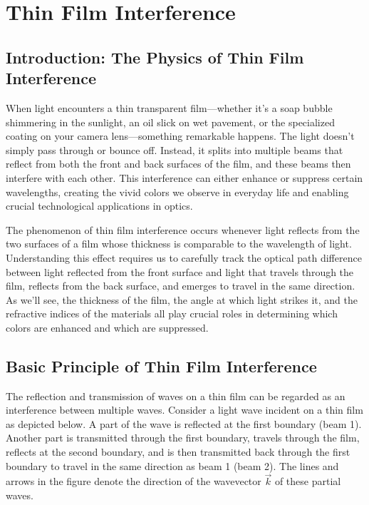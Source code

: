\documentclass[
  a4paper,
]{book}
\begin{document}
\chapter{Thin Film Interference}\label{thin-film-interference}

\section{Introduction: The Physics of Thin Film
Interference}\label{introduction-the-physics-of-thin-film-interference}

When light encounters a thin transparent film---whether it's a soap
bubble shimmering in the sunlight, an oil slick on wet pavement, or the
specialized coating on your camera lens---something remarkable happens.
The light doesn't simply pass through or bounce off. Instead, it splits
into multiple beams that reflect from both the front and back surfaces
of the film, and these beams then interfere with each other. This
interference can either enhance or suppress certain wavelengths,
creating the vivid colors we observe in everyday life and enabling
crucial technological applications in optics.

The phenomenon of thin film interference occurs whenever light reflects
from the two surfaces of a film whose thickness is comparable to the
wavelength of light. Understanding this effect requires us to carefully
track the optical path difference between light reflected from the front
surface and light that travels through the film, reflects from the back
surface, and emerges to travel in the same direction. As we'll see, the
thickness of the film, the angle at which light strikes it, and the
refractive indices of the materials all play crucial roles in
determining which colors are enhanced and which are suppressed.

\section{Basic Principle of Thin Film
Interference}\label{basic-principle-of-thin-film-interference}

The reflection and transmission of waves on a thin film can be regarded
as an interference between multiple waves. Consider a light wave
incident on a thin film as depicted below. A part of the wave is
reflected at the first boundary (beam 1). Another part is transmitted
through the first boundary, travels through the film, reflects at the
second boundary, and is then transmitted back through the first boundary
to travel in the same direction as beam 1 (beam 2). The lines and arrows
in the figure denote the direction of the wavevector \(\vec{k}\) of
these partial waves.
\end{document}
